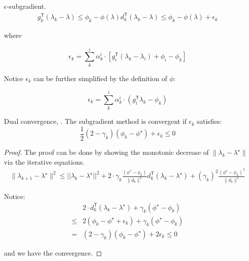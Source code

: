 \begin{lemma}\(\epsilon\)-subgradient.
  \begin{equation}\label{eq:subgrad}
    \begin{aligned}
      g_{k}^\mathsf{T}(\lambda_{k}  -\lambda) \le \phi_{k} - \phi(\lambda)
      d_{k}^\mathsf{T}(\lambda_{k}  -\lambda) \le \phi_{k} - \phi(\lambda) + \epsilon_k
    \end{aligned}
  \end{equation}
\end{lemma}

where

\begin{equation}\label{eq:def_eps}
  \epsilon_k = \sum^i_k \alpha^i_k \cdot \left [g_i^\mathsf{T}(\lambda_k - \lambda_i) + \phi_i - \phi_k \right ]
\end{equation}

Notice \(\epsilon_k\) can be further simplified by the definition of
\(\phi\):

\begin{equation}\label{eq:def_eps_simple}
  \epsilon_k = \sum^i_k \alpha^i_k \cdot \left ( g_i^\mathsf{T}\lambda_k  - \phi_k \right )
\end{equation}

\begin{lemma} \label{lemma:dual_conv} Dual convergence, \cite{brannlund1995generalized}. The
  subgradient method is convergent if \(\epsilon_k\) satisfies:
  \begin{equation}
    \frac{1}{2}(2 - \gamma_k) (\phi_{k} - \phi^\star)  + \epsilon_k \le 0
  \end{equation}
\end{lemma}
\begin{proof}
  The proof can be done by showing the monotonic decrease of
  \(\|\lambda_{k} - \lambda^\star\|\) via the iterative equations.
  \begin{equation}\begin{aligned}
      \|\lambda_{k+1} - \lambda^\star\|^2 \le ||\lambda_k - \lambda^\star||^2
      + 2\cdot \gamma_k \frac{(\phi^\star - \phi_{k})}{\|d_{k}\|^{2}} d_k^\mathsf{T}(\lambda_k - \lambda^\star)
      + (\gamma_{k})^{2} \frac{(\phi^\star - \phi_{k})^{2}}{\|d_{k}\|^{2}}
    \end{aligned}\end{equation}

  Notice: \begin{equation}\begin{aligned}
          & 2  \cdot d_k^\mathsf{T}(\lambda_k - \lambda^\star) + \gamma_{k}(\phi^\star - \phi_{k}) \\
      \le & 2 (\phi_{k} - \phi^\star + \epsilon_k) + \gamma_k(\phi^\star -\phi_k)                  \\
      =   & (2 - \gamma_k) (\phi_{k} - \phi^\star)  + 2\epsilon_k \le 0
    \end{aligned}\end{equation}

  and we have the convergence.
\end{proof}

